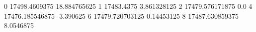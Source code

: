 0 17498.4609375 18.884765625
1 17483.4375 3.861328125
2 17479.576171875 0.0
4 17476.185546875 -3.390625
6 17479.720703125 0.14453125
8 17487.630859375 8.0546875
